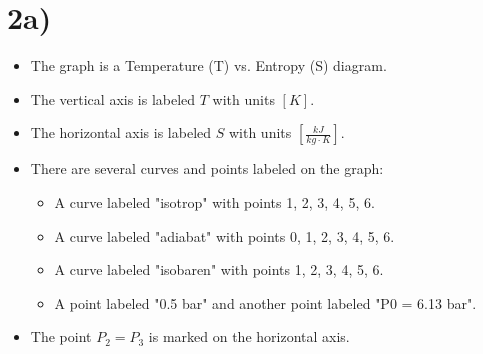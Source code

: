 

\section*{2a)}

\begin{itemize}
    \item The graph is a Temperature (T) vs. Entropy (S) diagram.
    \item The vertical axis is labeled \( T \) with units \([K]\).
    \item The horizontal axis is labeled \( S \) with units \(\left[\frac{kJ}{kg \cdot K}\right]\).
    \item There are several curves and points labeled on the graph:
        \begin{itemize}
            \item A curve labeled "isotrop" with points 1, 2, 3, 4, 5, 6.
            \item A curve labeled "adiabat" with points 0, 1, 2, 3, 4, 5, 6.
            \item A curve labeled "isobaren" with points 1, 2, 3, 4, 5, 6.
            \item A point labeled "0.5 bar" and another point labeled "P0 = 6.13 bar".
        \end{itemize}
    \item The point \( P_2 = P_3 \) is marked on the horizontal axis.
\end{itemize}